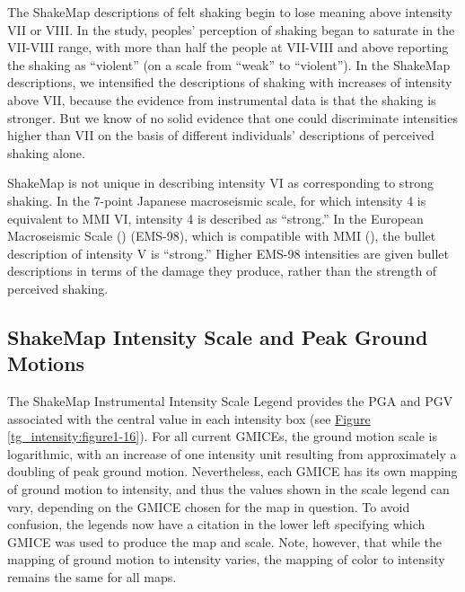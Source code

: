 \documentclass[letterpaper,10pt,english]{sphinxmanual}
\begin{document}
The ShakeMap descriptions of felt shaking begin to lose meaning above intensity VII or VIII. In
the {\hyperref[references:dengler1998]{}} study, peoples' perception of shaking began to saturate in
the VII-VIII range, with more than half the people at VII-VIII and above
reporting the shaking as ``violent'' (on a scale from ``weak'' to ``violent”).  In the ShakeMap
descriptions, we intensified the descriptions of shaking with increases of intensity above
VII, because the evidence from instrumental data is that the shaking is stronger.  But we
know of no solid evidence that one could discriminate intensities higher than VII on the
basis of different individuals' descriptions of perceived shaking alone.

ShakeMap is not unique in describing intensity VI as corresponding to strong shaking. In
the 7-point Japanese macroseismic scale, for which intensity 4 is equivalent to MMI VI,
intensity 4 is described as ``strong.'' In the European Macroseismic Scale ({\hyperref[references:grunthal1998]{}}) (EMS-98), which is compatible with MMI ({\hyperref[references:musson2010]{}}), the bullet description of intensity
V is  ``strong.''  Higher EMS-98 intensities are given bullet descriptions in terms of the
damage they produce, rather than the strength of perceived shaking.


\subsection{ShakeMap Intensity Scale and Peak Ground Motions}
\label{tg_intensity:shakemap-intensity-scale-and-peak-ground-motions}
The ShakeMap Instrumental Intensity Scale Legend provides the PGA and PGV
associated with the central value in each
intensity box (see \hyperref[tg_intensity:figure1-16]{Figure  \ref*{tg_intensity:figure1-16}}). For all current GMICEs, the ground motion scale is
logarithmic, with an increase of one intensity unit resulting from approximately a
doubling of peak ground motion. Nevertheless, each GMICE has its own mapping of
ground motion to intensity, and thus the values shown in the scale legend can vary,
depending on the GMICE chosen for the map in question. To avoid confusion, the
legends now have a citation in the lower left specifying which GMICE was used to
produce the map and scale. Note, however, that while the mapping of ground motion to
intensity varies, the mapping of color to intensity remains the same for all maps.
\end{document}
